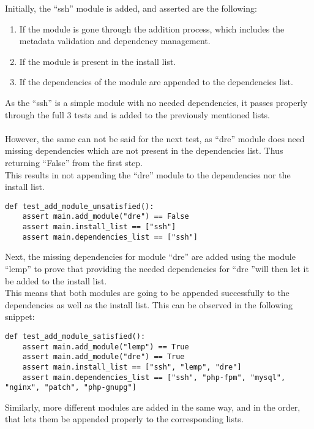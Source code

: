 Initially, the “ssh” module is added, and asserted are the following:
\begin{enumerate}
  \item If the module is gone through the addition process, which includes the metadata validation and dependency management.
  \item If the module is present in the install list.
  \item If the dependencies of the module are appended to the dependencies list.
\end{enumerate}

As the “ssh” is a simple module with no needed dependencies, it passes properly through the full 3 tests and is added to the previously mentioned lists.\\
\\
However, the same can not be said for the next test, as “dre” module does need missing dependencies which are not present in the dependencies list. Thus returning “False” from the first step.\\
This results in not appending the “dre” module to the dependencies nor the install list.

\begin{lstlisting}[caption=test\_add\_module\_unsatisfied, style=pythonstyle]
def test_add_module_unsatisfied():
    assert main.add_module("dre") == False
    assert main.install_list == ["ssh"]
    assert main.dependencies_list == ["ssh"]
\end{lstlisting}

Next, the missing dependencies for module “dre” are added using the module “lemp” to prove that providing the needed dependencies for “dre ”will then let it be added to the install list.\\
This means that both modules are going to be appended successfully to the dependencies as well as the install list. This can be observed in the following snippet:

\begin{lstlisting}[caption=test\_add\_module\_satisfied , style=pythonstyle]
def test_add_module_satisfied():
    assert main.add_module("lemp") == True
    assert main.add_module("dre") == True
    assert main.install_list == ["ssh", "lemp", "dre"]
    assert main.dependencies_list == ["ssh", "php-fpm", "mysql", "nginx", "patch", "php-gnupg"]
\end{lstlisting}

Similarly, more different modules are added in the same way, and in the order, that lets them be appended properly to the corresponding lists.

